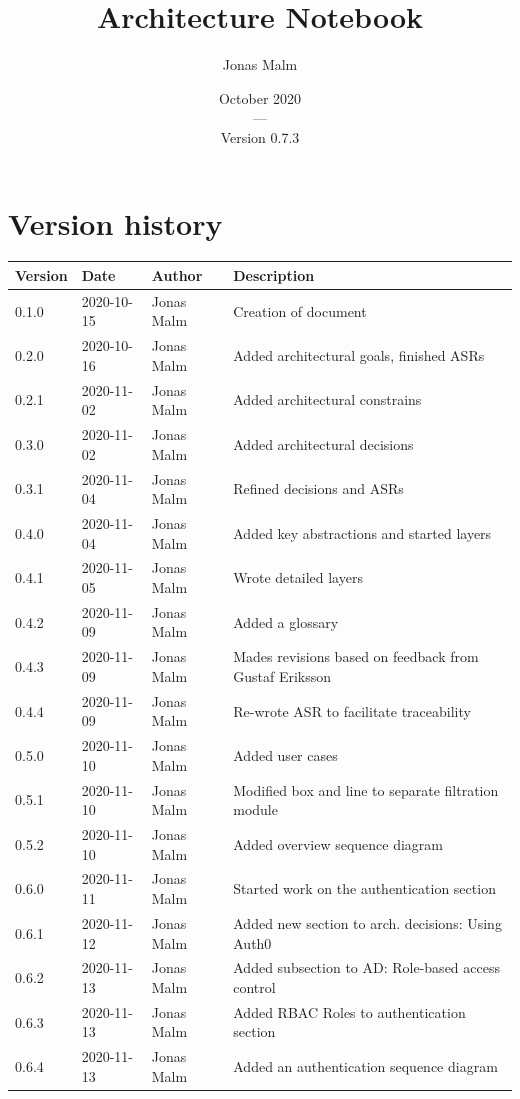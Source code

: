 \documentclass{article}
\title{Architecture Notebook}
\author{Jonas Malm}
\date{October 2020\\---\\Version 0.7.3}
\begin{document}
\maketitle
\clearpage

\begin{table}
\section*{Version history}
\centering
\begin{tabular}{|l|l|l|l|}
\hline
Version & Date & Author & Description \\ \hline
0.1.0 & 2020-10-15 & Jonas Malm & Creation of document\\ 
0.2.0 & 2020-10-16 & Jonas Malm & Added architectural goals, finished ASRs\\
0.2.1 & 2020-11-02 & Jonas Malm & Added architectural constrains\\ 
0.3.0 & 2020-11-02 & Jonas Malm & Added architectural decisions\\
0.3.1 & 2020-11-04 & Jonas Malm & Refined decisions and ASRs\\
0.4.0 & 2020-11-04 & Jonas Malm & Added key abstractions and started layers\\
0.4.1 & 2020-11-05 & Jonas Malm & Wrote detailed layers\\
0.4.2 & 2020-11-09 & Jonas Malm & Added a glossary\\
0.4.3 & 2020-11-09 & Jonas Malm & Mades revisions based on feedback from Gustaf Eriksson\\
0.4.4 & 2020-11-09 & Jonas Malm & Re-wrote ASR to facilitate traceability\\
0.5.0 & 2020-11-10 & Jonas Malm & Added user cases\\
0.5.1 & 2020-11-10 & Jonas Malm & Modified box and line to separate filtration module\\
0.5.2 & 2020-11-10 & Jonas Malm & Added overview sequence diagram\\
0.6.0 & 2020-11-11 & Jonas Malm & Started work on the authentication section\\
0.6.1 & 2020-11-12 & Jonas Malm & Added new section to arch. decisions: Using Auth0\\
0.6.2 & 2020-11-13 & Jonas Malm & Added subsection to AD: Role-based access control\\
0.6.3 & 2020-11-13 & Jonas Malm & Added RBAC Roles to authentication section\\
0.6.4 & 2020-11-13 & Jonas Malm & Added an authentication sequence diagram\\

\end{tabular}
\end{table}
\end{document}
